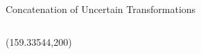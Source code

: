 \documentclass[14pt,aspectratio=169]{beamer}
\begin{document}
\begin{frame}[fragile]{Concatenation of Uncertain Transformations}
\begin{columns}
\begin{column}{0.4\textwidth}
\makebox(159.33544,200){%
}
\end{column}
\end{columns}
\end{frame}
\end{document}
